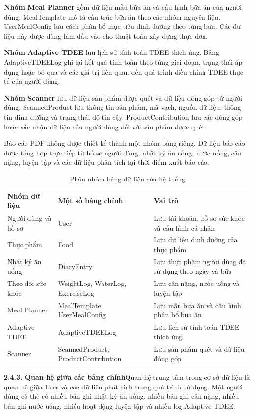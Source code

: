 \textbf{Nhóm Meal Planner} gồm dữ liệu mẫu bữa ăn và cấu hình bữa ăn của người dùng. MealTemplate mô tả cấu trúc bữa ăn theo các nhóm nguyên liệu. UserMealConfig lưu cách phân bổ mục tiêu dinh dưỡng theo từng bữa. Các dữ liệu này được dùng làm đầu vào cho thuật toán xây dựng thực đơn.

\textbf{Nhóm Adaptive TDEE} lưu lịch sử tính toán TDEE thích ứng. Bảng AdaptiveTDEELog ghi lại kết quả tính toán theo từng giai đoạn, trạng thái áp dụng hoặc bỏ qua và các giá trị liên quan đến quá trình điều chỉnh TDEE thực tế của người dùng.

\textbf{Nhóm Scanner} lưu dữ liệu sản phẩm được quét và dữ liệu đóng góp từ người dùng. ScannedProduct lưu thông tin sản phẩm, mã vạch, nguồn dữ liệu, thông tin dinh dưỡng và trạng thái độ tin cậy. ProductContribution lưu các đóng góp hoặc xác nhận dữ liệu của người dùng đối với sản phẩm được quét.

Báo cáo PDF không được thiết kế thành một nhóm bảng riêng. Dữ liệu báo cáo được tổng hợp trực tiếp từ hồ sơ người dùng, nhật ký ăn uống, nước uống, cân nặng, luyện tập và các dữ liệu phân tích tại thời điểm xuất báo cáo.

\begin{table}[H]
\centering
\caption{Phân nhóm bảng dữ liệu của hệ thống}
\begin{tabular}{|p{4cm}|p{5.5cm}|p{5.5cm}|}
\hline
\textbf{Nhóm dữ liệu} & \textbf{Một số bảng chính} & \textbf{Vai trò} \\ \hline
Người dùng và hồ sơ & User & Lưu tài khoản, hồ sơ sức khỏe và cấu hình cá nhân \\ \hline
Thực phẩm & Food & Lưu dữ liệu dinh dưỡng của thực phẩm \\ \hline
Nhật ký ăn uống & DiaryEntry & Lưu thực phẩm người dùng đã sử dụng theo ngày và bữa \\ \hline
Theo dõi sức khỏe & WeightLog, WaterLog, ExerciseLog & Lưu cân nặng, nước uống và luyện tập \\ \hline
Meal Planner & MealTemplate, UserMealConfig & Lưu mẫu bữa ăn và cấu hình phân bổ bữa ăn \\ \hline
Adaptive TDEE & AdaptiveTDEELog & Lưu lịch sử tính toán TDEE thích ứng \\ \hline
Scanner & ScannedProduct, ProductContribution & Lưu sản phẩm quét và dữ liệu đóng góp \\ \hline
\end{tabular}
\end{table}

\textbf{2.4.3. Quan hệ giữa các bảng chính}Quan hệ trung tâm trong cơ sở dữ liệu là quan hệ giữa User và các dữ liệu phát sinh trong quá trình sử dụng. Một người dùng có thể có nhiều bản ghi nhật ký ăn uống, nhiều bản ghi cân nặng, nhiều bản ghi nước uống, nhiều hoạt động luyện tập và nhiều log Adaptive TDEE.

